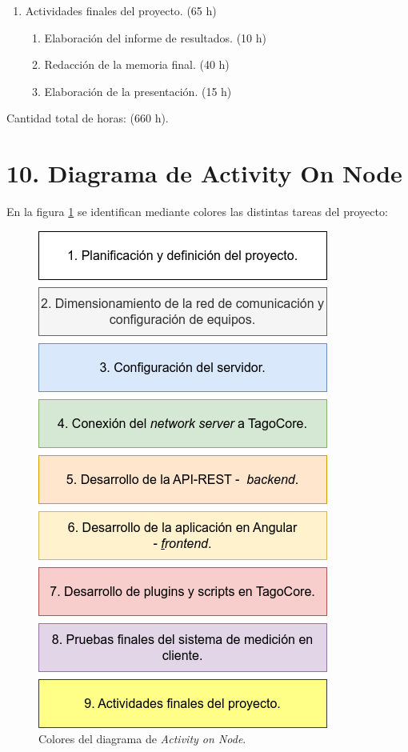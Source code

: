 \documentclass[
11pt, %
]{charter}
\begin{document}
\begin{enumerate}
\begin{enumerate}
	\item Registro del usuario cliente en la aplicación.  (1 h)
	\item Capacitación al usuario cliente en el uso de la aplicación. (1 h)
	\item Validación del cumplimiento de los requerimientos. (5 h)
	\item Redacción del manual de uso. (10 h)
	\end{enumerate}
\item Actividades finales del proyecto.   (65 h)
	\begin{enumerate}
	\item Elaboración del informe de resultados. (10 h)
	\item Redacción de la memoria final. (40 h)
	\item Elaboración de la presentación. (15 h)
	\end{enumerate}
\end{enumerate}
Cantidad total de horas: (660 h).

\section{10. Diagrama de Activity On Node}
\label{sec:AoN}
En la figura \ref{fig:AoN_task_color} se identifican mediante colores las distintas tareas del proyecto:
\begin{figure}[htpb]
\centering 
\includegraphics[width=.5\textwidth]{./Figuras/AoN_task_color.png}
\caption{ Colores del diagrama de \textit{Activity on Node}.}
\label{fig:AoN_task_color}
\end{figure}
\end{document}
